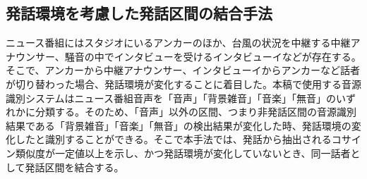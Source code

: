 \subsection{発話環境を考慮した発話区間の結合手法}
\label{prob2}
ニュース番組にはスタジオにいるアンカーのほか、台風の状況を中継する中継アナウンサー、騒音の中でインタビューを受けるインタビューイなどが存在する。そこで、アンカーから中継アナウンサー、インタビューイからアンカーなど話者が切り替わった場合、発話環境が変化することに着目した。本稿で使用する音源識別システムはニュース番組音声を「音声」「背景雑音」「音楽」「無音」のいずれかに分類する。そのため、「音声」以外の区間、つまり非発話区間の音源識別結果である「背景雑音」「音楽」「無音」の検出結果が変化した時、発話環境の変化したと識別することができる。そこで本手法では、発話から抽出されるコサイン類似度が一定値以上を示し、かつ発話環境が変化していないとき、同一話者として発話区間を結合する。\par
